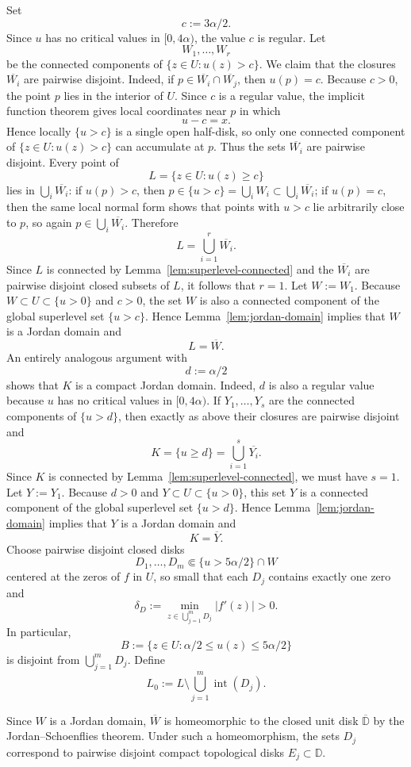 \documentclass[12pt]{amsart}
\theoremstyle{definition}
\theoremstyle{remark}
\begin{document}
\indent Set
\[
 c:=3\alpha/2.
\]
Since $u$ has no critical values in $[0,4\alpha)$, the value $c$ is regular. Let
\[
W_1,\dots,W_r
\]
be the connected components of $\{z\in U:u(z)>c\}$. We claim that the closures $\overline{W_i}$ are pairwise
disjoint. Indeed, if $p\in \overline{W_i}\cap\overline{W_j}$, then $u(p)=c$. Because $c>0$, the point $p$ lies in the interior of $U$.
Since $c$ is a regular value, the implicit function theorem gives local coordinates near $p$ in which
\[
 u-c=x.
\]
Hence locally $\{u>c\}$ is a single open half-disk, so only one connected component of $\{z\in U:u(z)>c\}$ can
accumulate at $p$. Thus the sets $\overline{W_i}$ are pairwise disjoint. Every point of
\[
 L=\{z\in U:u(z)\ge c\}
\]
lies in $\bigcup_i \overline{W_i}$: if $u(p)>c$, then $p\in\{u>c\}=\bigcup_i W_i\subset
\bigcup_i \overline{W_i}$; if $u(p)=c$, then the same local normal form shows that points with
$u>c$ lie arbitrarily close to $p$, so again $p\in\bigcup_i \overline{W_i}$. Therefore
\[
L=\bigcup_{i=1}^r \overline{W_i}.
\]
Since $L$ is connected by Lemma~\ref{lem:superlevel-connected} and the $\overline{W_i}$ are pairwise disjoint closed subsets of $L$, it follows
that $r=1$. Let $W:=W_1$. Because $W\subset U\subset\{u>0\}$ and $c>0$, the set $W$ is also a connected
component of the global superlevel set $\{u>c\}$. Hence Lemma~\ref{lem:jordan-domain} implies that $W$ is a Jordan domain and
\[
L=\overline W.
\]
An entirely analogous argument with
\[
 d:=\alpha/2
\]
shows that $K$ is a compact Jordan domain. Indeed, $d$ is also a regular value because $u$ has no critical
values in $[0,4\alpha)$. If $Y_1,\dots,Y_s$ are the connected components of $\{u>d\}$, then exactly as above their
closures are pairwise disjoint and
\[
K=\{u\ge d\}=\bigcup_{i=1}^s \overline{Y_i}.
\]
Since $K$ is connected by Lemma~\ref{lem:superlevel-connected}, we must have $s=1$. Let $Y:=Y_1$. Because $d>0$ and $Y\subset U\subset\{u>0\}$,
this set $Y$ is a connected component of the global superlevel set $\{u>d\}$. Hence Lemma~\ref{lem:jordan-domain} implies that $Y$
is a Jordan domain and
\[
K=\overline Y.
\]
Choose pairwise disjoint closed disks
\[
D_1,\dots,D_m\Subset \{u>5\alpha/2\}\cap W
\]
centered at the zeros of $f$ in $U$, so small that each $D_j$ contains exactly one
zero and
\[
\delta_D:=\min_{z\in \bigcup_{j=1}^m D_j}|f'(z)|>0.
\]
In particular,
\[
B:=\{z\in U:\alpha/2\le u(z)\le 5\alpha/2\}
\]
is disjoint from $\bigcup_{j=1}^m D_j$. Define
\[
L_0:=L\setminus \bigcup_{j=1}^m \operatorname{int}(D_j).
\]

Since $W$ is a Jordan domain, $\overline W$ is homeomorphic to the closed unit disk
$\overline{\mathbb D}$ by the Jordan--Schoenflies theorem. Under such a homeomorphism,
the sets $D_j$ correspond to pairwise disjoint compact topological disks
$E_j\subset \mathbb D$.
\end{document}
